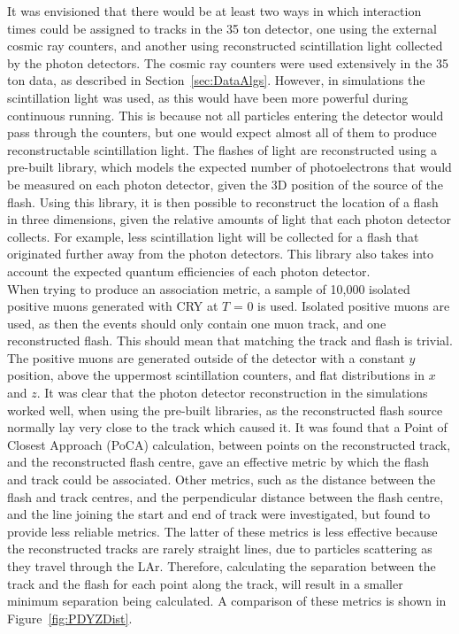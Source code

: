 It was envisioned that there would be at least two ways in which interaction times could be assigned to tracks in the 35 ton detector, one using the external cosmic ray counters, and another using reconstructed scintillation light collected by the photon detectors. The cosmic ray counters were used extensively in the 35 ton data, as described in Section~\ref{sec:DataAlgs}. However, in simulations the scintillation light was used, as this would have been more powerful during continuous running. This is because not all particles entering the detector would pass through the counters, but one would expect almost all of them to produce reconstructable scintillation light. The flashes of light are reconstructed using a pre-built library, which models the expected number of photoelectrons that would be measured on each photon detector, given the 3D position of the source of the flash. Using this library, it is then possible to reconstruct the location of a flash in three dimensions, given the relative amounts of light that each photon detector collects. For example, less scintillation light will be collected for a flash that originated further away from the photon detectors. This library also takes into account the expected quantum efficiencies of each photon detector. \\

When trying to produce an association metric, a sample of 10,000 isolated positive muons generated with CRY at $T$ = 0 is used. Isolated positive muons are used, as then the events should only contain one muon track, and one reconstructed flash. This should mean that matching the track and flash is trivial. The positive muons are generated outside of the detector with a constant $y$ position, above the uppermost scintillation counters, and flat distributions in $x$ and $z$. It was clear that the photon detector reconstruction in the simulations worked well, when using the pre-built libraries, as the reconstructed flash source normally lay very close to the track which caused it. It was found that a Point of Closest Approach (PoCA) calculation, between points on the reconstructed track, and the reconstructed flash centre, gave an effective metric by which the flash and track could be associated. Other metrics, such as the distance between the flash and track centres, and the perpendicular distance between the flash centre, and the line joining the start and end of track were investigated, but found to provide less reliable metrics. The latter of these metrics is less effective because the reconstructed tracks are rarely straight lines, due to particles scattering as they travel through the LAr. Therefore, calculating the separation between the track and the flash for each point along the track, will result in a smaller minimum separation being calculated. A comparison of these metrics is shown in Figure~\ref{fig:PDYZDist}. \\

